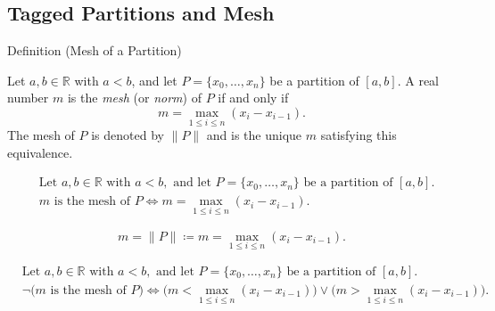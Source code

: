

\subsection*{Tagged Partitions and Mesh}
\label{sec:tagged-partitions}


\begin{definitionbox}{Definition (Mesh of a Partition)}
\begin{definition}
\label{def:mesh-of-partition}
Let $a,b \in \mathbb{R}$ with $a<b$, and let $P=\{x_0,\ldots,x_n\}$ be a partition of $[a,b]$. A real number $m$ is the \emph{mesh} (or \emph{norm}) of $P$ if and only if
\[
m=\max_{1\le i\le n}(x_i - x_{i-1}).
\]
The mesh of $P$ is denoted by $\|P\|$ and is the unique $m$ satisfying this equivalence.
\end{definition}
\end{definitionbox}

\begin{remark*}
\[
\begin{aligned}
&\text{Let } a,b\in\mathbb{R} \text{ with } a<b, \text{ and let } P=\{x_0,\ldots,x_n\} \text{ be a partition of } [a,b].\\
&m \text{ is the mesh of } P
\Longleftrightarrow
m=\max_{1\le i\le n}(x_i - x_{i-1}).
\end{aligned}
\]
\end{remark*}

\begin{remark*}
\[
m=\|P\| \coloneqq m=\max_{1\le i\le n}(x_i - x_{i-1}).
\]
\end{remark*}

\begin{remark*}
\[
\begin{aligned}
&\text{Let } a,b\in\mathbb{R} \text{ with } a<b, \text{ and let } P=\{x_0,\ldots,x_n\} \text{ be a partition of } [a,b].\\
&\neg\bigl(m \text{ is the mesh of } P\bigr)
\Longleftrightarrow
\bigl(m<\max_{1\le i\le n}(x_i - x_{i-1})\bigr)\lor\bigl(m>\max_{1\le i\le n}(x_i - x_{i-1})\bigr).
\end{aligned}
\]
\end{remark*}

